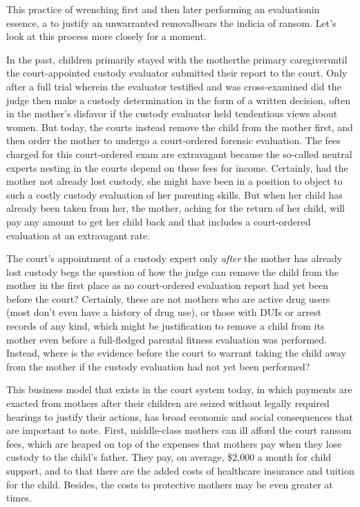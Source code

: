 This practice of wrenching first and then later performing an
evalua\-tion\mdash{}in essence, a  to justify an unwarranted
re\-moval\mdash{}bears the indicia of ransom. Let's look at this process more
closely for a moment. \pfl{}

In the past, children primarily stayed with the mother\mdash{}the primary
caregiver\mdash{}until the court-appointed custody evaluator submitted their
report to the court. Only after a full trial wherein the evaluator testified
and was cross-examined did the judge then make a custody 
determination in the form of a written decision, often in the mother's disfavor if
the custody evaluator held tendentious views about women. But today,
the courts instead remove the child from the mother first, and then
order the mother to undergo a court-ordered forensic evaluation. The
fees charged for this court-ordered exam are extravagant because the
so-called neutral experts nesting in the courts depend on these fees for
income. Certainly, had the mother not already lost custody, she might
have been in a position to object to such a costly custody evaluation of
her parenting skills. But when her child has already been taken from
her, the mother, aching for the return of her child, will pay any amount
to get her child back and that includes a court-ordered evaluation at an
extravagant rate. \pfl{}

The court's appointment of a custody expert only \textit{after} the mother
has already lost custody begs the question of how the judge can remove
the child from the mother in the first place as no court-ordered 
evaluation report had yet been before the court? Certainly, these are not
mothers who are active drug users (most don't even have a history
of drug use), or those with DUIs or arrest records of any kind, which
might be justification to remove a child from its mother even before a
full-fledged parental fitness evaluation was performed. Instead, where is
the evidence before the court to warrant taking the child away from the
mother if the custody evaluation had not yet been performed? \pfl{}


\vspace{3em}



\noindent{}This  business model that exists in the court system today, in
which payments are exacted from mothers after their children are
seized without legally required hearings to justify their actions, has
broad economic and social consequences that are important to note.
First, middle-class mothers can ill afford the court ransom fees, which
are heaped on top of the expenses that mothers pay when they lose 
custody to the child's father. They pay, on average, \$2,000 a month for child
support, and to that there are the added costs of healthcare insurance
and tuition for the child. Besides, the costs to protective mothers may
be even greater at times. \pfl{}

